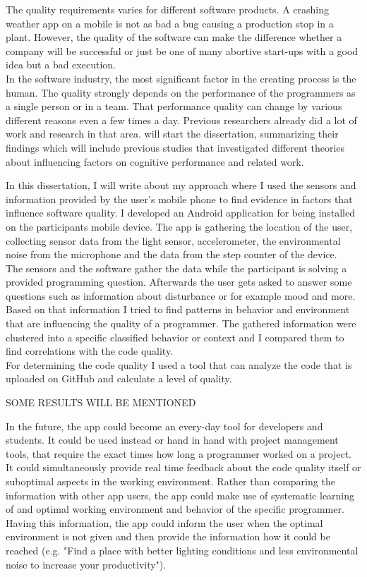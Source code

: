 The quality requirements varies for different software products. A crashing weather app on a mobile is not as bad a bug causing a production stop in a plant. 
However, the quality of the software can make the difference whether a company will be successful or just be one of many abortive start-ups with a good idea but a bad execution.
\\
In the software industry, the most significant factor in the creating process is the human. The quality strongly depends on the performance of the programmers as a single person or in a team. That performance quality can change by various different reasons even a few times a day.
\bigbreak 
Previous researchers already did a lot of work and research in that area. will start the dissertation, summarizing their findings which will include previous studies that investigated different theories about influencing factors on cognitive performance and related work.

\bigbreak
In this dissertation, I will write about my approach where I used the sensors and information provided by the user's mobile phone to find evidence in factors that influence software quality. 
I developed an Android application for being installed on the participants mobile device. The app is gathering the location of the user, collecting sensor data from the light sensor, accelerometer, the environmental noise from the microphone and the data from the step counter of the device. \\
The sensors and the software gather the data while the participant is solving a provided programming question. 
Afterwards the user gets asked to answer some questions such as information about disturbance or for example mood and more. \\
Based on that information I tried to find patterns in behavior and environment that are influencing the quality of a programmer. The gathered information were clustered into a specific classified behavior or context and I compared them to find correlations with the code quality.\\
For determining the code quality I used a tool that can analyze the code that is uploaded on GitHub and calculate a level of quality.
\bigbreak

SOME RESULTS WILL BE MENTIONED

\bigbreak
In the future, the app could become an every-day tool for developers and students. It could be used instead or hand in hand with project management tools, that require the exact times how long a programmer worked on a project. It could simultaneously provide real time feedback about the code quality itself or suboptimal aspects in the working environment. Rather than comparing the information with other app users, the app could make use of systematic learning of and optimal working environment and behavior of the specific programmer. Having this information, the app could inform the user when the optimal environment is not given and then provide the information how it could be reached (e.g. "Find a place with better lighting conditions and less environmental noise to increase your productivity"). 


